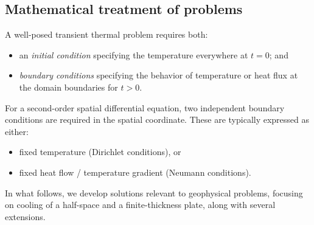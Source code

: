 \subsection{Mathematical treatment of problems}

A well-posed transient thermal problem requires both:
\begin{itemize}
    \item an \textit{initial condition} specifying the temperature everywhere at $t=0$; and
    \item \textit{boundary conditions} specifying the behavior of temperature or heat flux at the domain boundaries for $t>0$.
\end{itemize}

For a second-order spatial differential equation, two independent boundary conditions are required in the spatial coordinate. These are typically expressed as either:
\begin{itemize}
    \item fixed temperature (Dirichlet conditions), or
    \item fixed heat flow / temperature gradient (Neumann conditions).
\end{itemize}
In what follows, we develop solutions relevant to geophysical problems, focusing on cooling of a half-space and a finite-thickness plate, along with several extensions.

